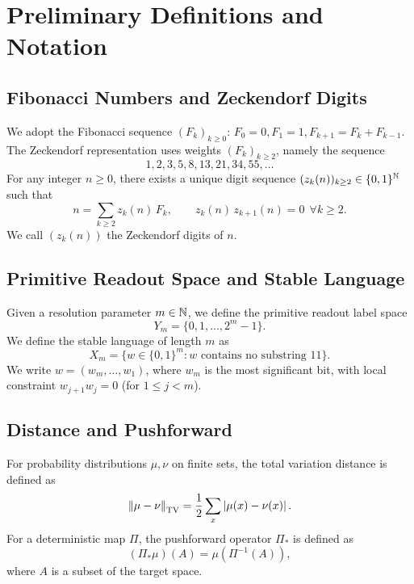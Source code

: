 \section{Preliminary Definitions and Notation}

\subsection{Fibonacci Numbers and Zeckendorf Digits}

We adopt the Fibonacci sequence $(F_k)_{k\ge 0}$: $F_0=0,F_1=1,F_{k+1}=F_k+F_{k-1}$. The Zeckendorf representation uses weights $(F_k)_{k\ge 2}$, namely the sequence
\[
1,2,3,5,8,13,21,34,55,\dots
\]
For any integer $n\ge 0$, there exists a unique digit sequence $(z_k(n))_{k\ge 2}\in\{0,1\}^{\mathbb{N}}$ such that
\[
n=\sum_{k\ge 2} z_k(n)\,F_k,\qquad z_k(n)\,z_{k+1}(n)=0\ \ \forall k\ge 2.
\]
We call $(z_k(n))$ the Zeckendorf digits of $n$.

\subsection{Primitive Readout Space and Stable Language}

Given a resolution parameter $m\in\mathbb{N}$, we define the primitive readout label space
\[
Y_m=\{0,1,\dots,2^m-1\}.
\]
We define the stable language of length $m$ as
\[
X_m=\{w\in\{0,1\}^m:\text{$w$ contains no substring }11\}.
\]
We write $w=(w_m,\dots,w_1)$, where $w_m$ is the most significant bit, with local constraint $w_{j+1}w_j=0$ (for $1\le j<m$).

\subsection{Distance and Pushforward}

For probability distributions $\mu,\nu$ on finite sets, the total variation distance is defined as
\[
\left\lVert \mu-\nu\right\rVert_{\mathrm{TV}}=\frac{1}{2}\sum_x\left\lvert \mu(x)-\nu(x)\right\rvert.
\]
For a deterministic map $\Pi$, the pushforward operator $\Pi_*$ is defined as
\[
(\Pi_*\mu)(A)=\mu(\Pi^{-1}(A)),
\]
where $A$ is a subset of the target space.
